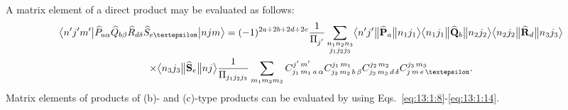 A matrix element of a direct product may be evaluated as follows:
\begin{multline}
\braOket{ n^{\prime} j^{\prime} m^{\prime}}{ \widehat{P}_{a \alpha} \widehat{Q}_{b \beta} \widehat{R}_{d \delta} \widehat{S}_{e \varepsilon}}{n j m}=(-1)^{2 a+2 b+2 d+2 e} \frac{1}{\Fact{j^{\prime}}} \sum_{\substack{n_{1} n_{2} n_{3} \\
j_{1} j_{2} j_{3}}}
\braOketred{ n^{\prime} j^{\prime}}{\widehat{\vect{P}}_{a}}{ n_{1} j_{1}}
\braOketred{ n_{1} j_{1}}{\widehat{\vect{Q}}_{b}}{ n_{2} j_{2}}
\braOketred{ n_{2} j_{2}}{\widehat{\vect{R}}_{d}}{ n_{3} j_{3}} \\
\times
\braOketred{ n_{3} j_{3}}{\widehat{\vect{S}}_{e}}{ n j} \frac{1}{\Fact{j_{1} j_{2} j_{3}}} \sum_{m_{1} m_{2} m_{3}} 
\clebsch{j_{1}}{m_{1}}{a}{\alpha}{j^{\prime}}{m^{\prime}} 
\clebsch{j_{2}}{m_{2}}{b}{\beta}{j_{1}}{m_{1}} 
\clebsch{j_{3}}{m_{3}}{d}{\delta}{j_{2}}{m_{2}}
\clebsch{j}{m}{e}{\varepsilon}{j_{3}}{m_{3}}. \label{eq:13:1:15}
\end{multline}
Matrix elements of products of (b)- and (c)-type products can be evaluated by using Eqs.~\eqref{eq:13:1:8}-\eqref{eq:13:1:14}.

